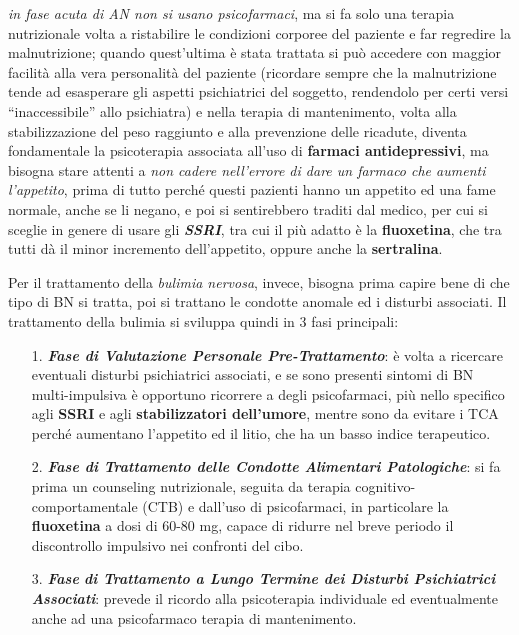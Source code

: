 \emph{in fase acuta di AN non si usano psicofarmaci}, ma si fa solo una
terapia nutrizionale volta a ristabilire le condizioni corporee del
paziente e far regredire la malnutrizione; quando quest'ultima è stata
trattata si può accedere con maggior facilità alla vera personalità del
paziente (ricordare sempre che la malnutrizione tende ad esasperare gli
aspetti psichiatrici del soggetto, rendendolo per certi versi
``inaccessibile'' allo psichiatra) e nella terapia di mantenimento,
volta alla stabilizzazione del peso raggiunto e alla prevenzione delle
ricadute, diventa fondamentale la psicoterapia associata all'uso di
\textbf{farmaci antidepressivi}, ma bisogna stare attenti a \emph{non
cadere nell'errore di dare un farmaco che aumenti l'appetito}, prima di
tutto perché questi pazienti hanno un appetito ed una fame normale,
anche se li negano, e poi si sentirebbero traditi dal medico, per cui si
sceglie in genere di usare gli \textbf{\emph{SSRI}}, tra cui il più
adatto è la \textbf{fluoxetina}, che tra tutti dà il minor incremento
dell'appetito, oppure anche la \textbf{sertralina}.

Per il trattamento della \emph{bulimia nervosa}, invece, bisogna prima
capire bene di che tipo di BN si tratta, poi si trattano le condotte
anomale ed i disturbi associati. Il trattamento della bulimia si
sviluppa quindi in 3 fasi principali:

\begin{itemize}
\item[1.]
  \textbf{\emph{Fase di Valutazione Personale Pre-Trattamento}}: è volta
  a ricercare eventuali disturbi psichiatrici associati, e se sono
  presenti sintomi di BN multi-impulsiva è opportuno ricorrere a degli
  psicofarmaci, più nello specifico agli \textbf{SSRI} e agli
  \textbf{stabilizzatori dell'umore}, mentre sono da evitare i TCA
  perché aumentano l'appetito ed il litio, che ha un basso indice
  terapeutico.
\item[2.]
  \textbf{\emph{Fase di Trattamento delle Condotte Alimentari
  Patologiche}}: si fa prima un counseling nutrizionale, seguita da
  terapia cognitivo-comportamentale (CTB) e dall'uso di psicofarmaci, in
  particolare la \textbf{fluoxetina} a dosi di 60-80 mg, capace di
  ridurre nel breve periodo il discontrollo impulsivo nei confronti del
  cibo.
\item[3.]
  \emph{\textbf{Fase} \textbf{di Trattamento a Lungo Termine dei
  Disturbi Psichiatrici Associati}}: prevede il ricordo alla
  psicoterapia individuale ed eventualmente anche ad una psicofarmaco
  terapia di mantenimento.
\end{itemize}

